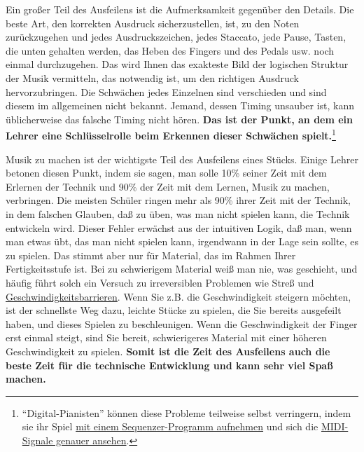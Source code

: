 Ein großer Teil des Ausfeilens ist die Aufmerksamkeit gegenüber den Details.
Die beste Art, den korrekten Ausdruck sicherzustellen, ist, zu den Noten zurückzugehen und jedes Ausdruckszeichen, jedes Staccato, jede Pause, Tasten, die unten gehalten werden, das Heben des Fingers und des Pedals usw. noch einmal durchzugehen.
Das wird Ihnen das exakteste Bild der logischen Struktur der Musik vermitteln, das notwendig ist, um den richtigen Ausdruck hervorzubringen.
Die Schwächen jedes Einzelnen sind verschieden und sind diesem im allgemeinen nicht bekannt.
Jemand, dessen Timing unsauber ist, kann üblicherweise das falsche Timing nicht hören.
\textbf{Das ist der Punkt, an dem ein Lehrer eine Schlüsselrolle beim Erkennen dieser Schwächen spielt.}\footnote{\enquote{Digital-Pianisten} können diese Probleme teilweise selbst verringern, indem sie ihr Spiel \hyperref[c1iii13MIDI]{mit einem Sequenzer-Programm aufnehmen} und sich die \hyperref[midi_check]{MIDI-Signale genauer ansehen}.}

Musik zu machen ist der wichtigste Teil des Ausfeilens eines Stücks.
Einige Lehrer betonen diesen Punkt, indem sie sagen, man solle 10\% seiner Zeit mit dem Erlernen der Technik und 90\% der Zeit mit dem Lernen, Musik zu machen, verbringen.
Die meisten Schüler ringen mehr als 90\% ihrer Zeit mit der Technik, in dem falschen Glauben, daß zu üben, was man nicht spielen kann, die Technik entwickeln wird.
Dieser Fehler erwächst aus der intuitiven Logik, daß man, wenn man etwas übt, das man nicht spielen kann, irgendwann in der Lage sein sollte, es zu spielen.
Das stimmt aber nur für Material, das im Rahmen Ihrer Fertigkeitsstufe ist.
Bei zu schwierigem Material weiß man nie, was geschieht, und häufig führt solch ein Versuch zu irreversiblen Problemen wie Streß und \hyperref[c1iv2b]{Geschwindigkeitsbarrieren}.
Wenn Sie z.B. die Geschwindigkeit steigern möchten, ist der schnellste Weg dazu, leichte Stücke zu spielen, die Sie bereits ausgefeilt haben, und dieses Spielen zu beschleunigen.
Wenn die Geschwindigkeit der Finger erst einmal steigt, sind Sie bereit, schwierigeres Material mit einer höheren Geschwindigkeit zu spielen.
\textbf{Somit ist die Zeit des Ausfeilens auch die beste Zeit für die technische Entwicklung und kann sehr viel Spaß machen.}

